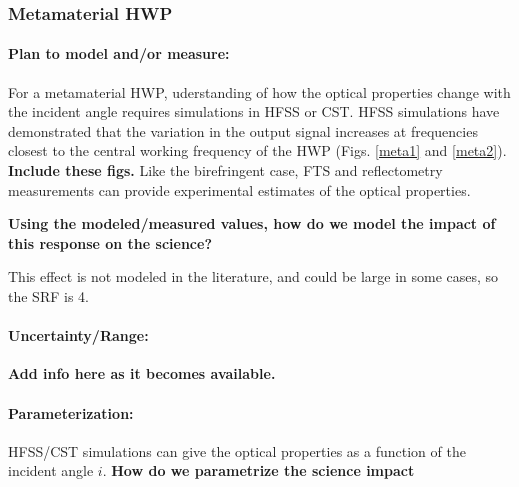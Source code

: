 \subsubsection{Metamaterial HWP}

\paragraph{Plan to model and/or measure:}
For a metamaterial HWP, uderstanding of how the optical properties change with the incident angle requires simulations in HFSS or CST. HFSS simulations have demonstrated that the variation in the output signal increases at frequencies closest to the central working frequency of the
HWP (Figs. \ref{meta1} and \ref{meta2}). \textbf{Include these figs.}
Like the birefringent case, FTS and reflectometry measurements can provide experimental estimates of the optical properties.

\textbf{Using the modeled/measured values, how do we model the impact of this response on the science?}

This effect is not modeled in the literature, and could be large in some cases, so the SRF is 4.

\paragraph{Uncertainty/Range:}
\textbf{Add info here as it becomes available.}

\paragraph{Parameterization:}
HFSS/CST simulations can give the optical properties as a function of the incident angle $i$. \textbf{How do we parametrize the science impact}


